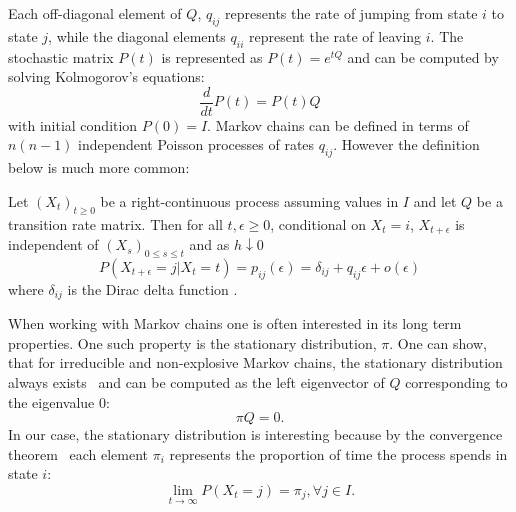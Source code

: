 Each off-diagonal element of $Q$, $q_{ij}$ represents the rate of jumping from state $i$ to state $j$,
while the diagonal elements $q_{ii}$ represent the rate of leaving $i$. The stochastic matrix
$P(t)$ is represented as $P(t) = e^{tQ}$ and can be computed by solving Kolmogorov's equations:
\begin{equation}
	\nonumber
	\frac{d}{dt}P(t) = P(t)Q
\end{equation}
with initial condition $P(0) = I$.
%
Markov chains can be defined in terms of $n(n-1)$ independent Poisson processes
of rates $q_{ij}$. However the definition below is much more common:%
\begin{defn}
	\label{def:ctmc}
	Let $(X_t)_{t \ge 0}$ be a right-continuous process assuming values in $I$ and let $Q$
	be a transition rate matrix. Then for all $t, \epsilon \ge 0$, conditional on $X_t = i$,
	$X_{t+\epsilon}$ is independent of $(X_s)_{0 \le s \le t}$ and as $h \downarrow 0$
	\begin{equation}
		\nonumber
		P(X_{t+\epsilon} = j | X_t = t) = p_{ij}(\epsilon) = \delta_{ij} + q_{ij}\epsilon + o(\epsilon)
	\end{equation}
	where $\delta_{ij}$ is the Dirac delta function \cite{norris1998markov}.
\end{defn}
When working with Markov
chains one is often interested in its long term properties. One such property is the
stationary distribution, $\pi$. One can show, that for irreducible and non-explosive Markov chains,
the stationary distribution always exists~\cite{norris1998markov} and can be computed as the left eigenvector of $Q$ 
corresponding to the eigenvalue $0$:
\begin{equation}
	\nonumber
	\pi Q = 0.
\end{equation}
In our case, the stationary distribution is interesting because by the convergence theorem~\cite{aldous-fill-2014}
each element $\pi_i$ represents the proportion of time the process spends in state $i$:
\begin{equation}
	\nonumber
	\lim\limits_{t \rightarrow \infty} P(X_t = j) = \pi_j, \forall j \in I.
\end{equation}

